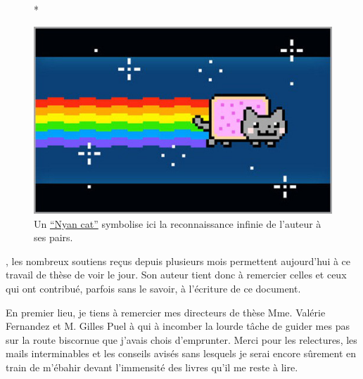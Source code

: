 

\begin{figure}[th!]*
  \raggedleft
  \begin{minipage}{8cm}
  \includegraphics[scale=0.6]{media/nyan_cat_thumb.jpg}
  \caption*{Un \href{https://www.youtube.com/watch?v=QH2-TGUlwu4}{``Nyan cat''} symbolise ici la reconnaissance infinie de l'auteur à ses pairs.}
  \end{minipage}
\end{figure}


, les nombreux soutiens reçus depuis plusieurs mois permettent aujourd'hui à ce travail de thèse de voir le jour. Son auteur tient donc à remercier celles et ceux qui ont contribué, parfois sans le savoir, à l'écriture de ce document.

En premier lieu, je tiens à remercier mes directeurs de thèse Mme. Valérie {\sc Fernandez} et M. Gilles {\sc Puel} à qui à incomber la lourde tâche de guider mes pas sur la route biscornue que j'avais chois d'emprunter. Merci pour les relectures, les mails interminables et les conseils avisés sans lesquels je serai encore sûrement en train de m'ébahir devant l'immensité des livres qu'il me reste à lire.


